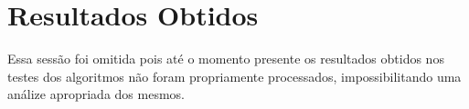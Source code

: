 \section{Resultados Obtidos}

Essa sessão foi omitida pois até o momento presente os resultados obtidos nos testes dos algoritmos não foram propriamente processados, impossibilitando uma análize apropriada dos mesmos.